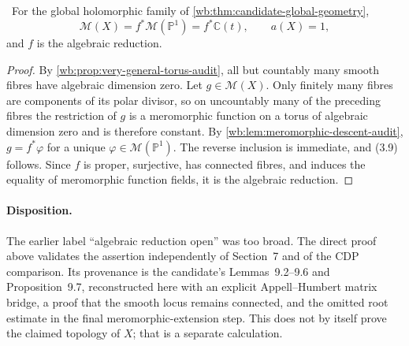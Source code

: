 \begin{theorem}
\label{wb:thm:algebraic-dimension-audit}
\ For the global holomorphic family of
\cref{wb:thm:candidate-global-geometry},
\[
 \mathcal M(X)=f^*\mathcal M(\mathbb P^1)=f^*\mathbb C(t),
 \qquad a(X)=1,
\tag{3.9}
\]
and \(f\) is the algebraic reduction.
\end{theorem}

\begin{proof}
By \cref{wb:prop:very-general-torus-audit}, all but countably many smooth
fibres have algebraic dimension zero.  Let \(g\in\mathcal M(X)\).  Only
finitely many fibres are components of its polar divisor, so on uncountably
many of the preceding fibres the restriction of \(g\) is a meromorphic
function on a torus of algebraic dimension zero and is therefore constant.
By \cref{wb:lem:meromorphic-descent-audit}, \(g=f^*\varphi\) for a unique
\(\varphi\in\mathcal M(\mathbb P^1)\).  The reverse inclusion is immediate,
and (3.9) follows.  Since \(f\) is proper, surjective, has connected fibres,
and induces the equality of meromorphic function fields, it is the algebraic
reduction.
\end{proof}

\paragraph{Disposition.}
The earlier label ``algebraic reduction open'' was too broad.  The direct
proof above validates the assertion independently of Section~7 and of the
CDP comparison.  Its provenance is the candidate's Lemmas~9.2--9.6 and
Proposition~9.7, reconstructed here with an explicit Appell--Humbert matrix
bridge, a proof that the smooth locus remains connected, and the omitted
root estimate in the final meromorphic-extension step.  This does not by
itself prove the claimed topology of \(X\); that is a separate calculation.
